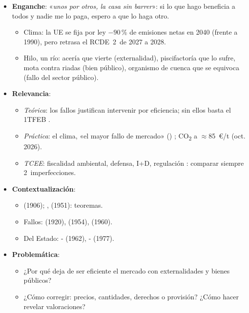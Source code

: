 \documentclass{article}
\begin{document}
\cabecerarepaso
\begin{columnas}

\begin{itemize}
\item \textbf{Enganche}: «\emph{unos por otros, la casa sin barrer}»: si lo que hago beneficia a todos y nadie me lo paga, espero a que lo haga otro.
  \begin{itemize}
  \item Clima: la UE se fija por ley $-90$\,\% de emisiones netas en 2040 (frente a 1990), pero retrasa el RCDE~2~de 2027 a 2028.
  \item Hilo, un río: acería que vierte (externalidad), piscifactoría que lo sufre, mota contra riadas (bien público), organismo de cuenca que se equivoca (fallo del sector público).
  \end{itemize}
\item \textbf{Relevancia}:
  \begin{itemize}
  \item \emph{Teórica}: los fallos justifican intervenir por eficiencia; sin ellos basta el 1TFEB .
  \item \emph{Práctica}: el clima, «el mayor fallo de mercado» () ; CO\textsubscript{2} a $\approx$85~€/t (oct. 2026).
  \item \emph{TCEE}: fiscalidad ambiental, defensa, I+D, regulación : comparar siempre 2~imperfecciones.
  \end{itemize}
\item \textbf{Contextualización}:
  \begin{itemize}
  \item {} (1906); ,  (1951): teoremas.
  \item Fallos:  (1920),  (1954),  (1960).
  \item Del Estado: - (1962), - (1977).
  \end{itemize}
\item \textbf{Problemática}:
  \begin{itemize}
  \item ¿Por qué deja de ser eficiente el mercado con externalidades y bienes públicos?
  \item ¿Cómo corregir: precios, cantidades, derechos o provisión? ¿Cómo hacer revelar valoraciones?

\end{itemize}
\end{itemize}
\end{columnas}
\end{document}
